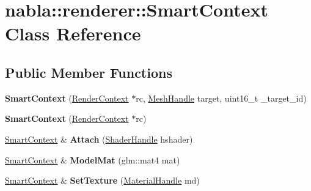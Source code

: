\hypertarget{classnabla_1_1renderer_1_1_smart_context}{}\section{nabla\+::renderer\+::Smart\+Context Class Reference}
\label{classnabla_1_1renderer_1_1_smart_context}
\subsection*{Public Member Functions}
\begin{DoxyCompactItemize}
\item 
\mbox{\label{classnabla_1_1renderer_1_1_smart_context_ab8b0af6a7ec89b7479d56cbd781c8650}} 
{\bfseries Smart\+Context} (\mbox{\hyperlink{structnabla_1_1renderer_1_1_render_context}{Render\+Context}} $\ast$rc, \mbox{\hyperlink{classnabla_1_1renderer_1_1_handle}{Mesh\+Handle}} target, uint16\+\_\+t \+\_\+target\+\_\+id)
\item 
\mbox{\label{classnabla_1_1renderer_1_1_smart_context_a51c616889b45f94fdce95f36b77d0fba}} 
{\bfseries Smart\+Context} (\mbox{\hyperlink{structnabla_1_1renderer_1_1_render_context}{Render\+Context}} $\ast$rc)
\item 
\mbox{\label{classnabla_1_1renderer_1_1_smart_context_ac5560cada892b4177ce65867f4ec5d64}} 
\mbox{\hyperlink{classnabla_1_1renderer_1_1_smart_context}{Smart\+Context}} \& {\bfseries Attach} (\mbox{\hyperlink{classnabla_1_1renderer_1_1_handle}{Shader\+Handle}} hshader)
\item 
\mbox{\label{classnabla_1_1renderer_1_1_smart_context_a017aabef3f3f4d240f22f6dbf06155e6}} 
\mbox{\hyperlink{classnabla_1_1renderer_1_1_smart_context}{Smart\+Context}} \& {\bfseries Model\+Mat} (glm\+::mat4 mat)
\item 
\mbox{\label{classnabla_1_1renderer_1_1_smart_context_aff8fd5d6236aa9377f6c88e4ff1d9f78}} 
\mbox{\hyperlink{classnabla_1_1renderer_1_1_smart_context}{Smart\+Context}} \& {\bfseries Set\+Texture} (\mbox{\hyperlink{classnabla_1_1renderer_1_1_handle}{Material\+Handle}} md)

\end{DoxyCompactItemize}

